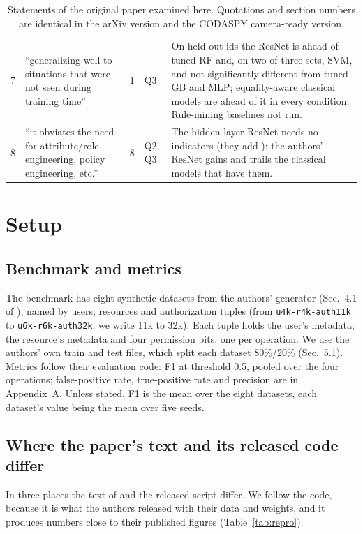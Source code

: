 \documentclass[11pt,a4paper]{article}
\begin{document}
\begin{table}[t]
\begin{tabular}{@{}p{0.5cm}p{6.3cm}p{0.9cm}p{0.7cm}p{6.2cm}@{}}
7 & ``generalizing well to situations that were not seen during training time'' & 1 & Q3 & On held-out ids the ResNet is ahead of tuned RF and, on two of three sets, SVM, and not significantly different from tuned GB and MLP; equality-aware classical models are ahead of it in every condition. Rule-mining baselines not run. \\
8 & ``it obviates the need for attribute/role engineering, policy engineering, etc.'' & 8 & Q2, Q3 & The hidden-layer ResNet needs no indicators (they add \vIndicatorsOnHeadU{}); the authors' ResNet gains \vIndicatorsOnResnetU{} and trails the classical models that have them. \\
\bottomrule
\end{tabular}
\caption{Statements of the original paper examined here. Quotations and section numbers are identical in the arXiv version and the CODASPY camera-ready version.}
\label{tab:claims}
\end{table}

\section{Setup}\label{sec:setup}

\subsection{Benchmark and metrics}
The benchmark has eight synthetic datasets from the authors' generator (Sec.~4.1 of \cite{nobi2022}), named by users, resources and authorization tuples (from \texttt{u4k-r4k-auth11k} to \texttt{u6k-r6k-auth32k}; we write 11k to 32k). Each tuple holds the user's metadata, the resource's metadata and four permission bits, one per operation. We use the authors' own train and test files, which split each dataset 80\%/20\% (Sec.~5.1). Metrics follow their evaluation code: F1 at threshold 0.5, pooled over the four operations; false-positive rate, true-positive rate and precision are in Appendix~A. Unless stated, F1 is the mean over the eight datasets, each dataset's value being the mean over five seeds.

\subsection{Where the paper's text and its released code differ}\label{sec:text-code}
In three places the text of \cite{nobi2022} and the released script differ. We follow the code, because it is what the authors released with their data and weights, and it produces numbers close to their published figures (Table~\ref{tab:repro}).
\end{document}
